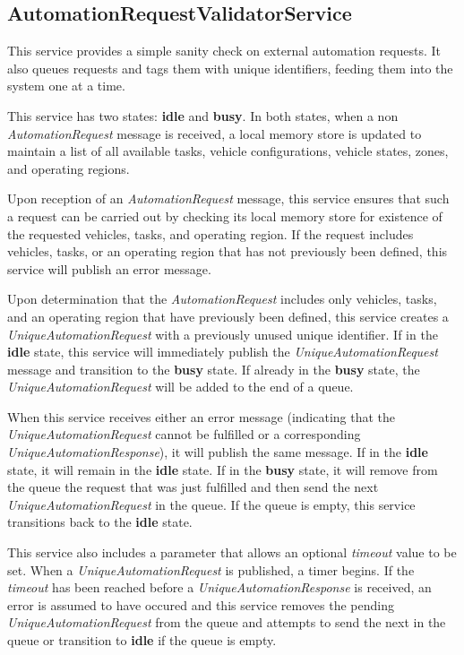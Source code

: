 \subsection{AutomationRequestValidatorService}\label{automationrequestvalidatorservice}

This service provides a simple sanity check on external automation
requests. It also queues requests and tags them with unique identifiers,
feeding them into the system one at a time.

This service has two states: \textbf{idle} and \textbf{busy}. In both
states, when a non \emph{AutomationRequest} message is received, a local
memory store is updated to maintain a list of all available tasks,
vehicle configurations, vehicle states, zones, and operating regions.

Upon reception of an \emph{AutomationRequest} message, this service
ensures that such a request can be carried out by checking its local
memory store for existence of the requested vehicles, tasks, and
operating region. If the request includes vehicles, tasks, or an
operating region that has not previously been defined, this service will
publish an error message.

Upon determination that the \emph{AutomationRequest} includes only
vehicles, tasks, and an operating region that have previously been
defined, this service creates a \emph{UniqueAutomationRequest} with a
previously unused unique identifier. If in the \textbf{idle} state, this
service will immediately publish the \emph{UniqueAutomationRequest}
message and transition to the \textbf{busy} state. If already in the
\textbf{busy} state, the \emph{UniqueAutomationRequest} will be added to
the end of a queue.

When this service receives either an error message (indicating that the
\emph{UniqueAutomationRequest} cannot be fulfilled or a corresponding
\emph{UniqueAutomationResponse}), it will publish the same message. If
in the \textbf{idle} state, it will remain in the \textbf{idle} state.
If in the \textbf{busy} state, it will remove from the queue the request
that was just fulfilled and then send the next
\emph{UniqueAutomationRequest} in the queue. If the queue is empty, this
service transitions back to the \textbf{idle} state.

This service also includes a parameter that allows an optional
\emph{timeout} value to be set. When a \emph{UniqueAutomationRequest} is
published, a timer begins. If the \emph{timeout} has been reached before
a \emph{UniqueAutomationResponse} is received, an error is assumed to
have occured and this service removes the pending
\emph{UniqueAutomationRequest} from the queue and attempts to send the
next in the queue or transition to \textbf{idle} if the queue is empty.

